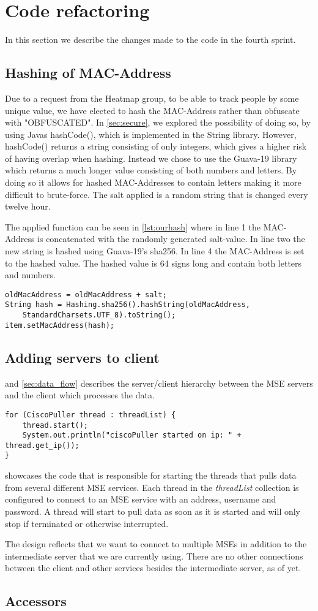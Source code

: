 \section{Code refactoring}
In this section we describe the changes made to the code in the fourth sprint.

\subsection*{Hashing of MAC-Address}
Due to a request from the Heatmap group, to be able to track people by some unique value, we have elected to hash the MAC-Address rather than obfuscate with "OBFUSCATED". In \cref{sec:secure}, we explored the possibility of doing so, by using Javas hashCode(), which is implemented in the String library. However, hashCode() returns a string consisting of only integers, which gives a higher risk of having overlap when hashing. Instead we chose to use the Guava-19 library which returns a much longer value consisting of both numbers and letters. By doing so it allows for hashed MAC-Addresses to contain letters making it more difficult to brute-force. The salt applied is a random string that is changed every twelve hour. 

The applied function can be seen in \cref{lst:ourhash} where in line 1 the MAC-Address is concatenated with the randomly generated salt-value. In line two the new string is hashed using Guava-19's sha256. In line 4 the MAC-Address is set to the hashed value. The hashed value is 64 signs long and contain both letters and numbers.

\begin{lstlisting}[caption={Hashing a MAC-Address},label={lst:ourhash},language=inc_Java]
oldMacAddress = oldMacAddress + salt;
String hash = Hashing.sha256().hashString(oldMacAddress, 
	StandardCharsets.UTF_8).toString();
item.setMacAddress(hash);
\end{lstlisting}

\subsection*{Adding servers to client}
 and \cref{sec:data_flow} describes the server/client hierarchy between the MSE servers and the client which processes the data. 
\begin{lstlisting}[caption={Starting multiple threads to pull data from multiple MSE servers}, label={lst:cisco_puller}, language=inc_Java]
for (CiscoPuller thread : threadList) {
    thread.start();
    System.out.println("ciscoPuller started on ip: " + thread.get_ip());
}
\end{lstlisting}
 showcases the code that is responsible for starting the threads that pulls data from several different MSE services. Each thread in the \textit{threadList} collection is configured to connect to an MSE service with an address, username and password. A thread will start to pull data as soon as it is started and will only stop if terminated or otherwise interrupted.

The design reflects that we want to connect to multiple MSEs in addition to the intermediate server that we are currently using. There are no other connections between the client and other services besides the intermediate server, as of yet.

\subsection*{Accessors}